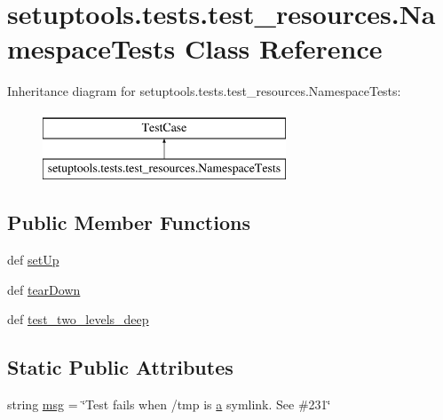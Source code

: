 \hypertarget{classsetuptools_1_1tests_1_1test__resources_1_1NamespaceTests}{}\section{setuptools.\+tests.\+test\+\_\+resources.\+Namespace\+Tests Class Reference}
\label{classsetuptools_1_1tests_1_1test__resources_1_1NamespaceTests}
Inheritance diagram for setuptools.\+tests.\+test\+\_\+resources.\+Namespace\+Tests\+:\begin{figure}[H]
\begin{center}
\leavevmode
\includegraphics[height=2.000000cm]{classsetuptools_1_1tests_1_1test__resources_1_1NamespaceTests}
\end{center}
\end{figure}
\subsection*{Public Member Functions}
\begin{DoxyCompactItemize}
\item 
def \hyperlink{classsetuptools_1_1tests_1_1test__resources_1_1NamespaceTests_ad3182af1970b2d7c15bd938275164f2a}{set\+Up}
\item 
def \hyperlink{classsetuptools_1_1tests_1_1test__resources_1_1NamespaceTests_a5985c576dcb266ec313c09b3b899d3c1}{tear\+Down}
\item 
def \hyperlink{classsetuptools_1_1tests_1_1test__resources_1_1NamespaceTests_ae7baa42903e74b2f1a2ef1b8ea8ed9e4}{test\+\_\+two\+\_\+levels\+\_\+deep}
\end{DoxyCompactItemize}
\subsection*{Static Public Attributes}
\begin{DoxyCompactItemize}
\item 
string \hyperlink{classsetuptools_1_1tests_1_1test__resources_1_1NamespaceTests_ab3876a0044b54ed83919692a01df3984}{msg} = \char`\"{}Test fails when /tmp is \hyperlink{gen__mat5files_8m_aae328bf20413f220e38aec4d95bfd6da}{a} symlink. See \#231\char`\"{}
\end{DoxyCompactItemize}


